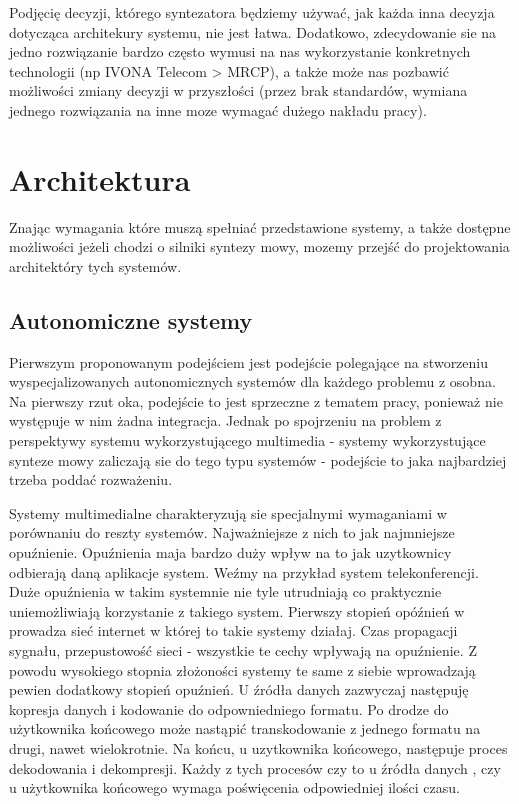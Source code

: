 Podjęcię decyzji, którego syntezatora będziemy używać, jak każda inna decyzja dotycząca architekury systemu, nie jest łatwa. Dodatkowo, zdecydowanie sie na jedno rozwiązanie bardzo często wymusi na nas wykorzystanie konkretnych technologii (np IVONA Telecom > MRCP), a także może nas pozbawić możliwości zmiany decyzji w przyszłości (przez brak standardów, wymiana jednego rozwiązania na inne moze wymagać dużego nakładu pracy).

\section {Architektura}

Znając wymagania które muszą spełniać przedstawione systemy, a także dostępne możliwości jeżeli chodzi o silniki syntezy mowy,  mozemy przejść do projektowania architektóry tych systemów.

\subsection {Autonomiczne systemy}
Pierwszym proponowanym podejściem jest podejście polegające na stworzeniu wyspecjalizowanych autonomicznych systemów dla każdego problemu z osobna. Na pierwszy rzut oka, podejście to jest sprzeczne z tematem pracy, ponieważ nie występuje w nim żadna integracja. Jednak po spojrzeniu na problem z perspektywy systemu wykorzystującego multimedia - systemy wykorzystujące synteze mowy zaliczają sie do tego typu systemów - podejście to jaka najbardziej trzeba poddać rozważeniu.

Systemy multimedialne charakteryzują sie specjalnymi wymaganiami w porównaniu do reszty systemów. Najważniejsze z nich to jak najmniejsze opuźnienie. Opuźnienia maja bardzo duży wpływ na to jak uzytkownicy odbierają daną aplikacje system. Weźmy na przykład system telekonferencji. Duże opuźnienia w takim systemnie nie tyle utrudniają co praktycznie uniemożliwiają korzystanie z takiego system. Pierwszy stopień opóźnień w prowadza sieć internet w której to takie systemy działaj. Czas propagacji sygnału, przepustowość sieci - wszystkie te cechy wpływają na opuźnienie. Z powodu wysokiego stopnia złożoności systemy te same z siebie wprowadzają pewien dodatkowy stopień opuźnień. U źródła danych zazwyczaj następuję kopresja danych i kodowanie do odpowniedniego formatu. Po drodze do użytkownika końcowego może nastąpić transkodowanie z jednego formatu na drugi, nawet wielokrotnie. Na końcu, u uzytkownika końcowego, następuje proces dekodowania i dekompresji. Każdy z tych procesów czy to u źródła danych , czy u użytkownika końcowego wymaga poświęcenia odpowiedniej ilości czasu. 

